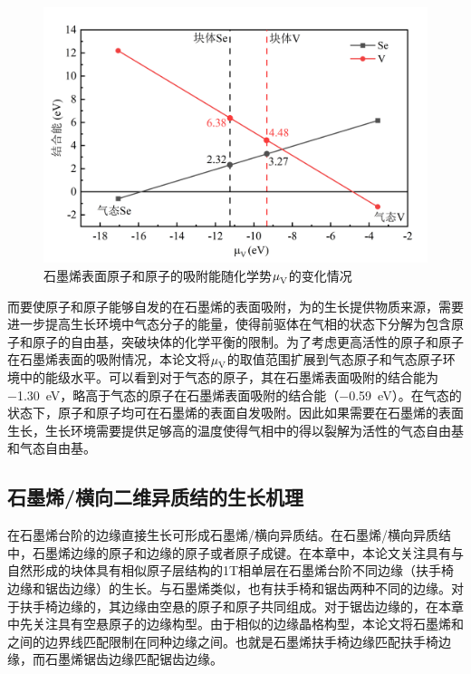    \begin{figure}[htb]
        \includegraphics{pic/VS_DFT_adatoms.png}
        \caption{石墨烯表面原子和原子的吸附能随化学势$\it \mu_{\rm V}^{\rm } \it$的变化情况}
        \label{fig:VS_DFT_adatoms}
    \end{figure}

    而要使原子和原子能够自发的在石墨烯的表面吸附，为的生长提供物质来源，需要进一步提高生长环境中气态分子的能量，使得前驱体在气相的状态下分解为包含原子和原子的自由基，突破块体的化学平衡的限制。为了考虑更高活性的原子和原子在石墨烯表面的吸附情况，本论文将$\it \mu_{\rm V}^{\rm } \it$的取值范围扩展到气态原子和气态原子环境中的能级水平。可以看到对于气态的原子，其在石墨烯表面吸附的结合能为\SI{-1.30}{\electronvolt}，略高于气态的原子在石墨烯表面吸附的结合能（\SI{-0.59}{\electronvolt}）。在气态的状态下，原子和原子均可在石墨烯的表面自发吸附。因此如果需要在石墨烯的表面生长，生长环境需要提供足够高的温度使得气相中的得以裂解为活性的气态自由基和气态自由基。

\subsection{石墨烯/横向二维异质结的生长机理}
    在石墨烯台阶的边缘直接生长可形成石墨烯/横向异质结。在石墨烯/横向异质结中，石墨烯边缘的原子和边缘的原子或者原子成键。在本章中，本论文关注具有与自然形成的块体具有相似原子层结构的1T相单层在石墨烯台阶不同边缘（扶手椅边缘和锯齿边缘）的生长。与石墨烯类似，也有扶手椅和锯齿两种不同的边缘。对于扶手椅边缘的，其边缘由空悬的原子和原子共同组成。对于锯齿边缘的，在本章中先关注具有空悬原子的边缘构型。由于相似的边缘晶格构型，本论文将石墨烯和之间的边界线匹配限制在同种边缘之间。也就是石墨烯扶手椅边缘匹配扶手椅边缘，而石墨烯锯齿边缘匹配锯齿边缘。

